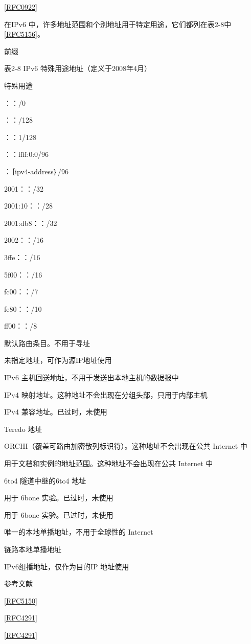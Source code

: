 \href{https://www.rfc-editor.org/rfc/rfc0922}{[RFC0922]}

在IPv6 中，许多地址范围和个别地址用于特定用途，它们都列在表2-8中\href{https://www.rfc-editor.org/rfc/rfc5156}{[RFC5156]}。

前缀

表2-8 IPv6 特殊用途地址（定义于2008年4月）

特殊用途

：：/0

：：/128

：：1/128

：：ffff:0:0/96

：｛ipv4-address｝/96

2001：：/32

2001:10：：/28

2001:db8：：/32

2002：：/16

3ffe：：/16

5f00：：/16

fc00：：/7

fe80：：/10

ff00：：/8

默认路由条目。不用于寻址

未指定地址，可作为源IP地址使用

IPv6 主机回送地址，不用于发送出本地主机的数据报中

IPv4 映射地址。这种地址不会出现在分组头部，只用于内部主机

IPv4 兼容地址。已过时，未使用

Teredo 地址

ORCHI（覆盖可路由加密散列标识符）。这种地址不会出现在公共 Internet 中

用于文档和实例的地址范围。这种地址不会出现在公共 Internet 中

6to4 隧道中继的6to4 地址

用于 6bone 实验。已过时，未使用

用于 6bone 实验。已过时，未使用

唯一的本地单播地址，不用于全球性的 Internet

链路本地单播地址

IPv6组播地址，仅作为目的IP 地址使用

参考文献

\href{https://www.rfc-editor.org/rfc/rfc5150}{[RFC5150]}

\href{https://www.rfc-editor.org/rfc/rfc4291}{[RFC4291]}

\href{https://www.rfc-editor.org/rfc/rfc4291}{[RFC4291]}

